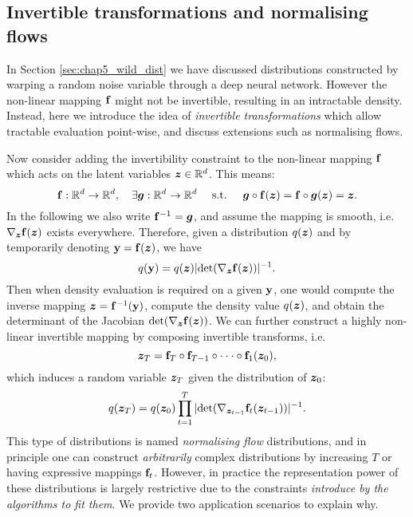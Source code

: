 \subsection{Invertible transformations and normalising flows}
In Section \ref{sec:chap5_wild_dist} we have discussed distributions constructed by warping a random noise variable through a deep neural network. However the non-linear mapping $\mathbf{f}$ might not be invertible, resulting in an intractable density. Instead, here we introduce the idea of \emph{invertible transformations} which allow tractable evaluation point-wise, and discuss extensions such as normalising flows.

Now consider adding the invertibility constraint to the non-linear mapping $\mathbf{f}$ which acts on the latent variables $\bm{z} \in \mathbb{R}^d$. This means:
$$\mathbf{f}: \mathbb{R}^d \rightarrow \mathbb{R}^d, \quad \exists \bm{g}: \mathbb{R}^{d} \rightarrow \mathbb{R}^d 
\quad \text{ s.t. } \quad \bm{g} \circ \mathbf{f}(\bm{z}) = \mathbf{f} \circ \bm{g}(\bm{z}) = \bm{z}.$$
In the following we also write $\mathbf{f}^{-1} = \bm{g}$, and assume the mapping is smooth, i.e.~$\nabla_{\bm{z}} \mathbf{f}(\bm{z})$ exists everywhere. Therefore, given a distribution $q(\bm{z})$ and by temporarily denoting $\mathbf{y} = \mathbf{f}(\bm{z})$, we have
\begin{equation}
q(\mathbf{y}) = q(\bm{z}) | \text{det}(\nabla_{\bm{z}} \mathbf{f}(\bm{z})) |^{-1}.
\end{equation}
Then when density evaluation is required on a given $\mathbf{y}$, one would compute the inverse mapping $\bm{z} = \mathbf{f}^{-1}(\mathbf{y})$, compute the density value $q(\bm{z})$, and obtain the determinant of the Jacobian $\text{det}(\nabla_{\bm{z}}\mathbf{f} (\bm{z}))$. We can further construct a highly non-linear invertible mapping by composing invertible transforms, i.e.
$$ \bm{z}_{T} = \mathbf{f}_{T} \circ \mathbf{f}_{T-1} \circ \cdot \cdot \cdot \circ \mathbf{f}_{1} (\bm{z}_0), $$
which induces a random variable $\bm{z}_T$ given the distribution of $\bm{z}_0$:
\begin{equation}
q(\bm{z}_{T}) = q(\bm{z}_0) \prod_{t=1}^T  | \text{det}(\nabla_{\bm{z}_{t-1}} \mathbf{f}_t(\bm{z}_{t-1})) |^{-1}.
\end{equation}
This type of distributions is named \emph{normalising flow} distributions, and in principle one can construct \emph{arbitrarily} complex distributions by increasing $T$ or having expressive mappings $\mathbf{f}_t$. However, in practice the representation power of these distributions is largely restrictive due to the constraints \emph{introduce by the algorithms to fit them}. We provide two application scenarios to explain why.
